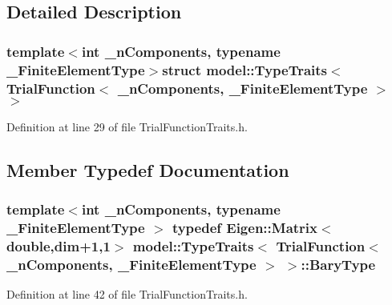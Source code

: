 \subsection{Detailed Description}
\subsubsection*{template$<$int \+\_\+n\+Components, typename \+\_\+\+Finite\+Element\+Type$>$struct model\+::\+Type\+Traits$<$ Trial\+Function$<$ \+\_\+n\+Components, \+\_\+\+Finite\+Element\+Type $>$ $>$}



Definition at line 29 of file Trial\+Function\+Traits.\+h.



\subsection{Member Typedef Documentation}
\hypertarget{structmodel_1_1_type_traits_3_01_trial_function_3_01__n_components_00_01___finite_element_type_01_4_01_4_ab9d37a71e58765425267d776b47a8548}{}
\subsubsection[{Bary\+Type}]{\setlength{\rightskip}{0pt plus 5cm}template$<$int \+\_\+n\+Components, typename \+\_\+\+Finite\+Element\+Type $>$ typedef Eigen\+::\+Matrix$<$double,{\bf dim}+1,1$>$ {\bf model\+::\+Type\+Traits}$<$ {\bf Trial\+Function}$<$ \+\_\+n\+Components, \+\_\+\+Finite\+Element\+Type $>$ $>$\+::{\bf Bary\+Type}}\label{structmodel_1_1_type_traits_3_01_trial_function_3_01__n_components_00_01___finite_element_type_01_4_01_4_ab9d37a71e58765425267d776b47a8548}


Definition at line 42 of file Trial\+Function\+Traits.\+h.

\hypertarget{structmodel_1_1_type_traits_3_01_trial_function_3_01__n_components_00_01___finite_element_type_01_4_01_4_a3f394cdc5c638178f7044046520df52b}{}
